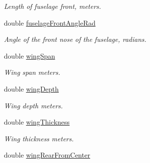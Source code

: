 \begin{DoxyCompactItemize}
\begin{DoxyCompactList}\small\item\em Length of fuselage front, meters. \end{DoxyCompactList}\item 
\hypertarget{class_shadow_uav_display_ad4c3b858136b21bd390ac63824cb7c52}{
double \hyperlink{class_shadow_uav_display_ad4c3b858136b21bd390ac63824cb7c52}{fuselageFrontAngleRad}}
\label{class_shadow_uav_display_ad4c3b858136b21bd390ac63824cb7c52}

\begin{DoxyCompactList}\small\item\em Angle of the front nose of the fuselage, radians. \end{DoxyCompactList}\item 
\hypertarget{class_shadow_uav_display_a92d095e39c10a87fc9d0208e20ff481e}{
double \hyperlink{class_shadow_uav_display_a92d095e39c10a87fc9d0208e20ff481e}{wingSpan}}
\label{class_shadow_uav_display_a92d095e39c10a87fc9d0208e20ff481e}

\begin{DoxyCompactList}\small\item\em Wing span meters. \end{DoxyCompactList}\item 
\hypertarget{class_shadow_uav_display_a915eb646eef7d1e529e8a7fd3db49947}{
double \hyperlink{class_shadow_uav_display_a915eb646eef7d1e529e8a7fd3db49947}{wingDepth}}
\label{class_shadow_uav_display_a915eb646eef7d1e529e8a7fd3db49947}

\begin{DoxyCompactList}\small\item\em Wing depth meters. \end{DoxyCompactList}\item 
\hypertarget{class_shadow_uav_display_a92bd1668450f324c6f408613e72d2729}{
double \hyperlink{class_shadow_uav_display_a92bd1668450f324c6f408613e72d2729}{wingThickness}}
\label{class_shadow_uav_display_a92bd1668450f324c6f408613e72d2729}

\begin{DoxyCompactList}\small\item\em Wing thickness meters. \end{DoxyCompactList}\item 
\hypertarget{class_shadow_uav_display_ac5961250ac29fc6f4ca1256ae565baef}{
double \hyperlink{class_shadow_uav_display_ac5961250ac29fc6f4ca1256ae565baef}{wingRearFromCenter}}
\label{class_shadow_uav_display_ac5961250ac29fc6f4ca1256ae565baef}


\end{DoxyCompactItemize}

